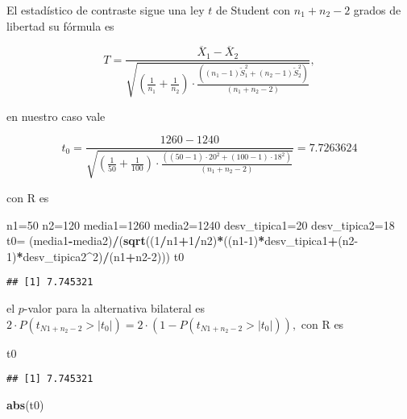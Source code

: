 \documentclass[
]{article}
\newenvironment{Shaded}{\begin{snugshade}}{\end{snugshade}}
\newcommand{\DecValTok}[1]{\textcolor[rgb]{0.00,0.00,0.81}{#1}}
\newcommand{\KeywordTok}[1]{\textcolor[rgb]{0.13,0.29,0.53}{\textbf{#1}}}
\newcommand{\NormalTok}[1]{#1}
\newcommand{\OperatorTok}[1]{\textcolor[rgb]{0.81,0.36,0.00}{\textbf{#1}}}
\newcommand{\StringTok}[1]{\textcolor[rgb]{0.31,0.60,0.02}{#1}}
\begin{document}
El estadístico de contraste sigue una ley \(t\) de Student con
\(n_1+n_2-2\) grados de libertad su fórmula es

\[
T=\frac{\overline{X}_1-\overline{X}_2}
{\sqrt{(\frac1{n_1}+\frac1{n_2})\cdot 
\frac{((n_1-1)\widetilde{S}_1^2+(n_2-1)\widetilde{S}_2^2)}
{(n_1+n_2-2)}}},
\]

en nuestro caso vale

\[
t_0=\frac{1260-1240}
{\sqrt{(\frac1{50}+\frac1{100})\cdot 
\frac{((50-1)\cdot 20^2+(100-1)\cdot  18^2)}
{(n_1+n_2-2)}}}=7.7263624 
\]

con R es

\begin{Shaded}
\begin{Highlighting}[]
\NormalTok{n1=}\DecValTok{50}
\NormalTok{n2=}\DecValTok{120}
\NormalTok{media1=}\DecValTok{1260}
\NormalTok{media2=}\DecValTok{1240}
\NormalTok{desv_tipica1=}\DecValTok{20}
\NormalTok{desv_tipica2=}\DecValTok{18}
\NormalTok{t0=}\StringTok{ }\NormalTok{(media1}\OperatorTok{-}\NormalTok{media2)}\OperatorTok{/}\NormalTok{(}\KeywordTok{sqrt}\NormalTok{((}\DecValTok{1}\OperatorTok{/}\NormalTok{n1}\OperatorTok{+}\DecValTok{1}\OperatorTok{/}\NormalTok{n2)}\OperatorTok{*}\NormalTok{((n1}\DecValTok{-1}\NormalTok{)}\OperatorTok{*}\NormalTok{desv_tipica1}\OperatorTok{+}\NormalTok{(n2}\DecValTok{-1}\NormalTok{)}\OperatorTok{*}\NormalTok{desv_tipica2}\OperatorTok{^}\DecValTok{2}\NormalTok{)}\OperatorTok{/}\NormalTok{(n1}\OperatorTok{+}\NormalTok{n2}\DecValTok{-2}\NormalTok{)))}
\NormalTok{t0}
\end{Highlighting}
\end{Shaded}

\begin{verbatim}
## [1] 7.745321
\end{verbatim}

el \(p\)-valor para la alternativa bilateral es
\(2\cdot P(t_{N1+n_2-2}>|t_0|)=2\cdot (1-P(t_{N1+n_2-2}>|t_0|)),\) con R
es

\begin{Shaded}
\begin{Highlighting}[]
\NormalTok{t0}
\end{Highlighting}
\end{Shaded}

\begin{verbatim}
## [1] 7.745321
\end{verbatim}

\begin{Shaded}
\begin{Highlighting}[]
\KeywordTok{abs}\NormalTok{(t0)}
\end{Highlighting}
\end{Shaded}
\end{document}
